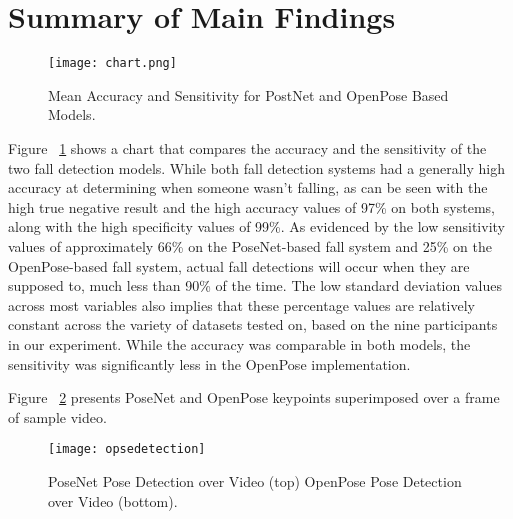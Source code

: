\section{Summary of Main Findings}

\begin{figure}
  \texttt{[image: chart.png]}
  \caption{Mean Accuracy and Sensitivity for PostNet and OpenPose Based Models.}
  \label{fig:chart}
\end{figure}


Figure ~\ref{fig:chart} shows a chart that compares the accuracy and the sensitivity of the two fall detection models. While both fall detection systems had a generally high accuracy at determining when someone wasn’t falling, as can be seen with the high true negative result and the high accuracy values of 97\% on both systems, along with the high specificity values of 99\%. As evidenced by the low sensitivity values of approximately 66\% on the PoseNet-based fall system and 25\% on the OpenPose-based fall system, actual fall detections will occur when they are supposed to, much less than 90\% of the time. The low standard deviation values across most variables also implies that these percentage values are relatively constant across the variety of datasets tested on, based on the nine participants in our experiment. While the accuracy was comparable in both models, the sensitivity was significantly less in the OpenPose implementation.




Figure ~\ref{fig:opsedetection} presents PoseNet and OpenPose keypoints superimposed over a frame of sample video.


\begin{figure}
  \texttt{[image: opsedetection]}
  \caption{PoseNet Pose Detection over Video (top) OpenPose Pose Detection over Video (bottom).}
  \label{fig:opsedetection}
\end{figure}





